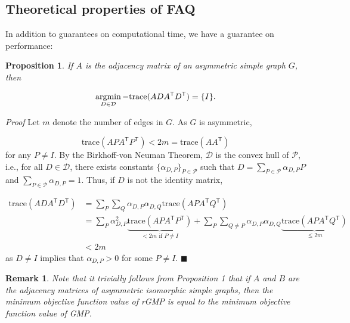\documentclass[10pt]{article}
\newtheorem{prop}{Proposition}
\providecommand{\mc}[1]{\mathcal{#1}}
\providecommand{\mc}[1]{\mathcal{#1}}
\newcommand{\T}{^{\ensuremath{\mathsf{T}}}}
\newcommand{\argmin}{\operatornamewithlimits{argmin}}
\newtheorem{rem}{Remark}
\begin{document}
\subsection{Theoretical properties of FAQ}
\label{sub:theory}

In addition to guarantees on computational time, we have a guarantee on performance:  
\begin{prop}
If $A$ is the adjacency matrix of an asymmetric simple graph $G$, then 

$$\argmin_{D\in\mc{D}} -\mathrm{trace}(ADA\T D\T)=\{I\}.$$
\end{prop}
{\it Proof}
Let $m$ denote the number of edges in $G$.  As $G$ is asymmetric,

$$\text{trace}(APA\T P\T)<2m=\text{trace}(AA\T )$$ for any $P\neq I.$  By the Birkhoff-von Neuman Theorem, ${\mathcal D}$ is the convex hull
of $\mc{P}$, i.e., for all $D \in {\mathcal D}$, there exists
constants $\{ \alpha_{D,P} \}_{P \in \mc{P}}$ such that
$D=\sum_{P \in \mc{P}}\alpha_{D,P}P$ and $\sum_{P \in \mc{P}}\alpha_{D,P}=1$.
Thus, if $D$ is not the identity matrix,

\begin{align*}
\text{trace}(ADA\T D\T)&=\sum_{P}\sum_{Q}\alpha_{D,P}\alpha_{D,Q}\text{trace}(APA\T Q\T)\\
&=\sum_{P}\alpha_{D,P}^2\underbrace{\text{trace}(APA\T P\T)}_{<2m\text{ if }P\neq I}+\sum_{P}\sum_{Q\neq P}\alpha_{D,P}\alpha_{D,Q}\underbrace{\text{trace}(APA\T Q\T)}_{\leq 2m}\\
&<2m
\end{align*}
as $D\neq I$ implies that $\alpha_{D,P}>0$ for some $P\neq I$. $\blacksquare$

\begin{rem}
	\emph{Note that it trivially follows from Proposition 1 that if $A$ and $B$ are the adjacency matrices of asymmetric isomorphic simple graphs, then the minimum objective function value of rGMP is equal to the minimum objective function value of GMP.}
\end{rem}
\end{document}
